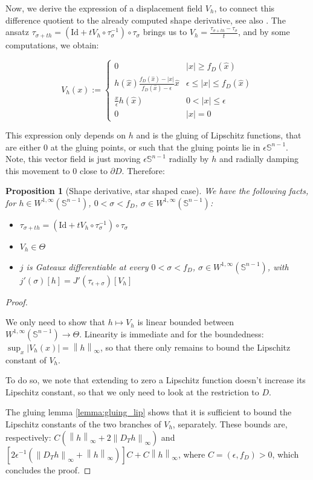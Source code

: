 \documentclass[english,a4paper,10pt,oneside]{scrbook}	%
\theoremstyle{break}
\newtheorem{prop}[equation]{Proposition}
\newenvironment{mproof}[1][\proofname]{%
  \begin{proof}[#1]$ $\par\nobreak\ignorespaces
}{%
  \end{proof}
}
\renewcommand*{\proofname}{Proof}
\theoremstyle{remark}
\newcommand{\mS}{\mathbb{S}^{n-1}}
\newcommand{\ds}{\displaystyle}
\newcommand{\norm}[1]{\left\lVert#1\right\rVert}
\newcommand{\id}{\text{Id}}
\newcommand{\Te}{\Theta}
\newcommand{\xh}{\hat{x}}
\newcommand{\eps}{\epsilon}
\begin{document}
Now, we derive the expression of a displacement field $V_h$, to connect this difference quotient to the already computed shape derivative, see also \cite{deckelnick}. The ansatz $\tau_{\sigma+th}=(\id + tV_h\circ \tau_\sigma^{-1})\circ \tau_\sigma$ brings us to $V_h = \ds \frac{\tau_{\sigma+th}-\tau_\sigma}{t}$, and by some computations, we obtain: 

$$V_h(x) :=\left\{\begin{matrix}
 0 & |x|\geq f_D(\xh)\\ 
 h(\xh)\frac{f_D(\xh)-|x|}{f_D(\xh)-\eps}\xh & \eps \leq |x| \leq f_D(\xh) \\ 
 \frac{x}{\epsilon}h(\hat{x}) & 0<|x|\leq \eps\\ 
 0 & |x|=0
\end{matrix}\right.$$

This expression only depends on $h$ and is the gluing of Lipschitz functions, that are either $0$ at the gluing points, or such that the gluing points lie in $\eps\mS$. Note, this vector field is just moving $\eps \mS$ radially by $h$ and radially damping this movement to $0$ close to $\partial D$. Therefore:

\begin{prop}[Shape derivative, star shaped case]
\label{prop:star_shaped_gradient}
We have the following facts, for $h \in W^{1,\infty}(\mS)$, $0<\sigma<f_D$, $\sigma \in W^{1,\infty}(\mS)$:

\begin{itemize}
	\item $\tau_{\sigma+th}=(\id + tV_h\circ \tau_\sigma^{-1})\circ \tau_\sigma$
	\item $V_h \in \Te$
	\item $j$ is Gateaux differentiable at every $0<\sigma<f_D$, $\sigma \in W^{1,\infty}(\mS)$, with $j'(\sigma)[h] = J'(\tau_{\eps+\sigma})[V_h]$
\end{itemize}

\end{prop}
\begin{mproof}

We only need to show that $h\mapsto V_h$ is linear bounded between $W^{1,\infty}(\mS)\rightarrow \Te$. Linearity is immediate and for the boundedness: $\sup_x|V_h(x)| = \norm{h}_\infty$, so that there only remains to bound the Lipschitz constant of $V_h$. 

To do so, we note that extending to zero a Lipschitz function doesn't increase its Lipschitz constant, so that we only need to look at the restriction to $D$.

The gluing lemma \cref{lemma:gluing_lip} shows that it is sufficient to bound the Lipschitz constants of the two branches of $V_h$, separately.
These bounds are, respectively: $C(\norm{h}_\infty + 2\norm{D_T h}_\infty)$ and $[2\eps^{-1}(\norm{D_T h}_\infty + \norm{h}_\infty)]C+C\norm{h}_\infty$, where $C=(\eps, f_D)>0$, which concludes the proof.
\end{mproof}
\end{document}
